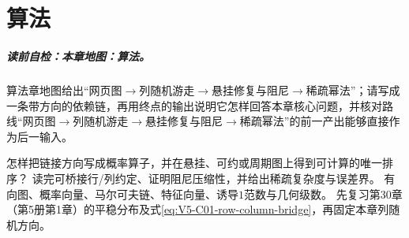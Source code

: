 
\chapter{\PageRank{} 算法}\label{chap:V5-C07}

\paragraph{读前自检：本章地图：算法。}\PageRank{} 算法章地图给出“网页图$\to$列随机游走$\to$悬挂修复与阻尼$\to$稀疏幂法”；请写成一条带方向的依赖链，再用终点的输出说明它怎样回答本章核心问题，并核对路线“网页图$\to$列随机游走$\to$悬挂修复与阻尼$\to$稀疏幂法”的前一产出能够直接作为后一输入。\par

{怎样把链接方向写成概率算子，并在悬挂、可约或周期图上得到可计算的唯一排序？}
{读完可桥接行/列约定、证明阻尼压缩性，并给出稀疏复杂度与误差界。}
{有向图、概率向量、马尔可夫链、特征向量、诱导$1$范数与几何级数。}
{先复习第30章（第5册第1章）的平稳分布及式\eqref{eq:V5-C01-row-column-bridge}，再固定本章列随机方向。}

